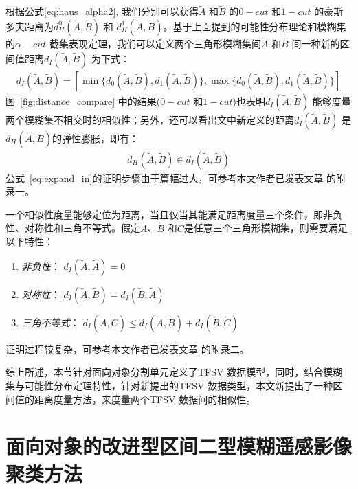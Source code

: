 根据公式\ref{eq:haus_alpha2}, 我们分别可以获得$\tilde{A}$ 和$\tilde{B}$ 的$0-cut$ 和$1-cut$ 的豪斯多夫距离为$d_H^{0} (\tilde{A}, \tilde{B})$ 和 $d_H^{1} (\tilde{A}, \tilde{B})$。基于上面提到的可能性分布理论和模糊集的$\alpha-cut$ 截集表现定理，我们可以定义两个三角形模糊集间$\tilde{A}$ 和$\tilde{B}$ 间一种新的区间值距离$d_I (\tilde{A}, \tilde{B})$ 为下式：
\begin{equation}\label{eq:interval}
    \begin{split}
        d _{I} (\tilde{A},\tilde{B}) = [\min \lbrace d_0 (\tilde{A},\tilde{B}),d_1(\tilde{A},\tilde{B}) \rbrace, \max \lbrace d_0(\tilde{A},\tilde{B}), d_1 (\tilde{A},\tilde{B}) \rbrace ]
    \end{split}
\end{equation}
图~\ref{fig:distance_compare} 中的结果($0-cut$ 和$1-cut$)也表明$d _{I} (\tilde{A},\tilde{B})$ 能够度量两个模糊集不相交时的相似性；另外，还可以看出文中新定义的距离$ d _{I} (\tilde{A},\tilde{B})$ 是$ d _{H} (\tilde{A},\tilde{B})$的弹性膨胀，即有：
\begin{equation}\label{eq:expand_in}
    \begin{split}
        d _{H} (\tilde{A},\tilde{B}) \in d _{I} (\tilde{A},\tilde{B})
    \end{split}
\end{equation}
公式~\ref{eq:expand_in}的证明步骤由于篇幅过大，可参考本文作者已发表文章\cite{jiang2018enhanced} 的附录一。

一个相似性度量能够定位为距离，当且仅当其能满足距离度量三个条件，即非负性、对称性和三角不等式。假定$\tilde{A}$、$\tilde{B}$ 和$\tilde{C}$是任意三个三角形模糊集，则需要满足以下特性：
\begin{enumerate}[(1)]
    \item \textsl{非负性}： $d_I(\tilde{A}, \tilde{A}) = 0$
    \item\textsl{对称性}： $d_I(\tilde{A}, \tilde{B}) = d_I(\tilde{B}, \tilde{A})$
    \item  \textsl{三角不等式}： $d_I(\tilde{A}, \tilde{C}) \leq d_I(\tilde{A}, \tilde{B}) + d_I(\tilde{B}, \tilde{C})$
\end{enumerate}
证明过程较复杂，可参考本文作者已发表文章\cite{jiang2018enhanced} 的附录二。

综上所述，本节针对面向对象分割单元定义了TFSV 数据模型，同时，结合模糊集与可能性分布定理特性，针对新提出的TFSV 数据类型，本文新提出了一种区间值的距离度量方法，来度量两个TFSV 数据间的相似性。


\section{面向对象的改进型区间二型模糊遥感影像聚类方法}
\label{sec::chap03-3}


